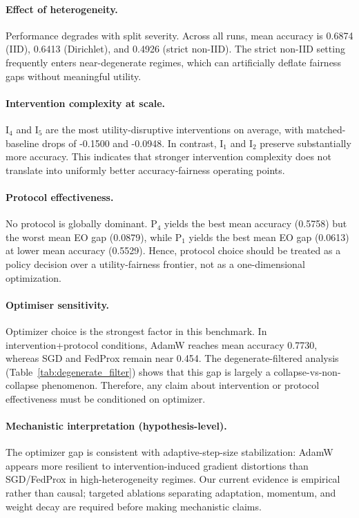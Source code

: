 ﻿\documentclass{article}
\begin{document}
\paragraph{Effect of heterogeneity.}
Performance degrades with split severity.
Across all runs, mean accuracy is 0.6874 (IID), 0.6413 (Dirichlet), and
0.4926 (strict non-IID).
The strict non-IID setting frequently enters near-degenerate regimes,
which can artificially deflate fairness gaps without meaningful utility.

\paragraph{Intervention complexity at scale.}
I$_4$ and I$_5$ are the most utility-disruptive interventions on average,
with matched-baseline drops of -0.1500 and -0.0948.
In contrast, I$_1$ and I$_2$ preserve substantially more accuracy.
This indicates that stronger intervention complexity does not translate
into uniformly better accuracy-fairness operating points.

\paragraph{Protocol effectiveness.}
No protocol is globally dominant.
P$_4$ yields the best mean accuracy (0.5758) but the worst mean EO gap
(0.0879), while P$_1$ yields the best mean EO gap (0.0613) at lower
mean accuracy (0.5529).
Hence, protocol choice should be treated as a policy decision over a
utility-fairness frontier, not as a one-dimensional optimization.

\paragraph{Optimiser sensitivity.}
Optimizer choice is the strongest factor in this benchmark.
In intervention+protocol conditions, AdamW reaches mean accuracy 0.7730,
whereas SGD and FedProx remain near 0.454.
The degenerate-filtered analysis (Table~\ref{tab:degenerate_filter})
shows that this gap is largely a collapse-vs-non-collapse phenomenon.
Therefore, any claim about intervention or protocol effectiveness must be
conditioned on optimizer.

\paragraph{Mechanistic interpretation (hypothesis-level).}
The optimizer gap is consistent with adaptive-step-size stabilization:
AdamW appears more resilient to intervention-induced gradient
distortions than SGD/FedProx in high-heterogeneity regimes.
Our current evidence is empirical rather than causal; targeted ablations
separating adaptation, momentum, and weight decay are required before
making mechanistic claims.
\end{document}
